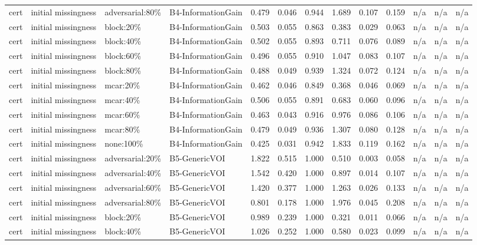 \begin{table}[!ht]
{\begin{tabular}{lllllllllllll}
cert & initial missingness & adversarial:80\% & B4-InformationGain & 0.479 & 0.046 & 0.944 & 1.689 & 0.107 & 0.159 & n/a & n/a & n/a \\
cert & initial missingness & block:20\% & B4-InformationGain & 0.503 & 0.055 & 0.863 & 0.383 & 0.029 & 0.063 & n/a & n/a & n/a \\
cert & initial missingness & block:40\% & B4-InformationGain & 0.502 & 0.055 & 0.893 & 0.711 & 0.076 & 0.089 & n/a & n/a & n/a \\
cert & initial missingness & block:60\% & B4-InformationGain & 0.496 & 0.055 & 0.910 & 1.047 & 0.083 & 0.107 & n/a & n/a & n/a \\
cert & initial missingness & block:80\% & B4-InformationGain & 0.488 & 0.049 & 0.939 & 1.324 & 0.072 & 0.124 & n/a & n/a & n/a \\
cert & initial missingness & mcar:20\% & B4-InformationGain & 0.462 & 0.046 & 0.849 & 0.368 & 0.046 & 0.069 & n/a & n/a & n/a \\
cert & initial missingness & mcar:40\% & B4-InformationGain & 0.506 & 0.055 & 0.891 & 0.683 & 0.060 & 0.096 & n/a & n/a & n/a \\
cert & initial missingness & mcar:60\% & B4-InformationGain & 0.463 & 0.043 & 0.916 & 0.976 & 0.086 & 0.106 & n/a & n/a & n/a \\
cert & initial missingness & mcar:80\% & B4-InformationGain & 0.479 & 0.049 & 0.936 & 1.307 & 0.080 & 0.128 & n/a & n/a & n/a \\
cert & initial missingness & none:100\% & B4-InformationGain & 0.425 & 0.031 & 0.942 & 1.833 & 0.119 & 0.162 & n/a & n/a & n/a \\
cert & initial missingness & adversarial:20\% & B5-GenericVOI & 1.822 & 0.515 & 1.000 & 0.510 & 0.003 & 0.058 & n/a & n/a & n/a \\
cert & initial missingness & adversarial:40\% & B5-GenericVOI & 1.542 & 0.420 & 1.000 & 0.897 & 0.014 & 0.107 & n/a & n/a & n/a \\
cert & initial missingness & adversarial:60\% & B5-GenericVOI & 1.420 & 0.377 & 1.000 & 1.263 & 0.026 & 0.133 & n/a & n/a & n/a \\
cert & initial missingness & adversarial:80\% & B5-GenericVOI & 0.801 & 0.178 & 1.000 & 1.976 & 0.045 & 0.208 & n/a & n/a & n/a \\
cert & initial missingness & block:20\% & B5-GenericVOI & 0.989 & 0.239 & 1.000 & 0.321 & 0.011 & 0.066 & n/a & n/a & n/a \\
cert & initial missingness & block:40\% & B5-GenericVOI & 1.026 & 0.252 & 1.000 & 0.580 & 0.023 & 0.099 & n/a & n/a & n/a \\

\end{tabular}}
\end{table}
